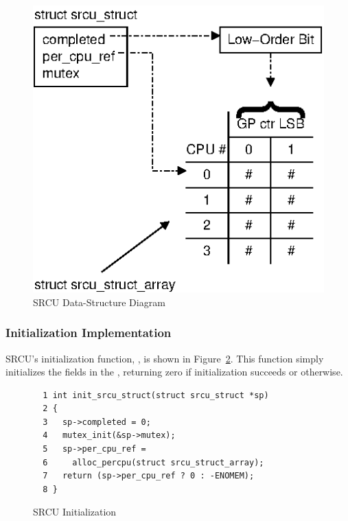 \begin{figure}[htb]
\begin{center}
\includegraphics{appendix/rcuimpl/srcuds}
\end{center}
\caption{SRCU Data-Structure Diagram}
\label{fig:app:whymb:SRCU Data-Structure Diagram}
\end{figure}

\subsubsection{Initialization Implementation}
\label{sec:app:rcuimpl:Initialization Implementation}

SRCU's initialization function, , is shown in
Figure~\ref{fig:app:rcuimpl:SRCU Initialization}.
This function simply initializes the fields in the
 , returning zero if initialization succeeds
or  otherwise.

\begin{figure}[htbp]
{ \scriptsize
\begin{verbatim}
  1 int init_srcu_struct(struct srcu_struct *sp)
  2 {
  3   sp->completed = 0;
  4   mutex_init(&sp->mutex);
  5   sp->per_cpu_ref =
  6     alloc_percpu(struct srcu_struct_array);
  7   return (sp->per_cpu_ref ? 0 : -ENOMEM);
  8 }
\end{verbatim}
}
\caption{SRCU Initialization}
\label{fig:app:rcuimpl:SRCU Initialization}
\end{figure}

